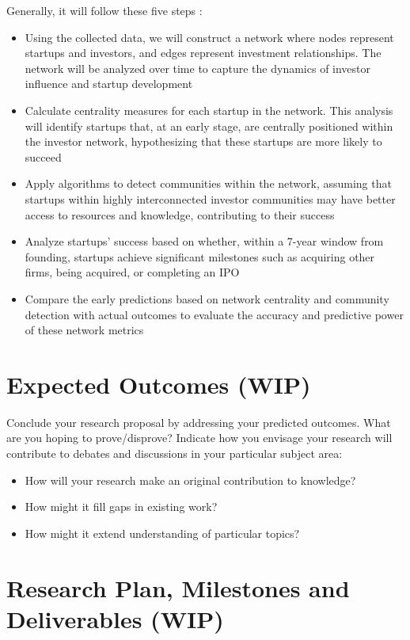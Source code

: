 \documentclass[a4paper,11pt]{article}
\begin{document}
Generally, it will follow these five steps : 
\begin{itemize}
    \item Using the collected data, we will construct a network where nodes represent startups and investors, and edges represent investment relationships. The network will be analyzed over time to capture the dynamics of investor influence and startup development
    \item Calculate centrality measures for each startup in the network. This analysis will identify startups that, at an early stage, are centrally positioned within the investor network, hypothesizing that these startups are more likely to succeed
    \item Apply algorithms to detect communities within the network, assuming that startups within highly interconnected investor communities may have better access to resources and knowledge, contributing to their success
    \item Analyze startups' success based on whether, within a 7-year window from founding, startups achieve significant milestones such as acquiring other firms, being acquired, or completing an IPO
    \item Compare the early predictions based on network centrality and community detection with actual outcomes to evaluate the accuracy and predictive power of these network metrics
\end{itemize}

\section{Expected Outcomes (WIP)}

Conclude your research proposal by addressing your predicted outcomes. What are you hoping to prove/disprove? Indicate how you envisage your research will contribute to debates and discussions in your particular subject area:

\begin{itemize}
    \item How will your research make an original contribution to knowledge?
    \item How might it fill gaps in existing work? 
    \item How might it extend understanding of particular topics?
\end{itemize}


\section{Research Plan, Milestones and Deliverables (WIP)}
\end{document}
